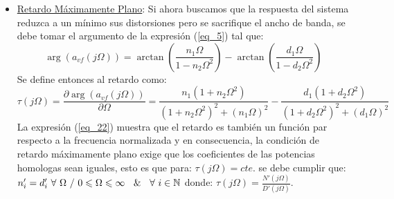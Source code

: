 \documentclass[12pt,a4paper]{article}
\begin{document}
\begin{itemize}
    
     \item \underline{Retardo Máximamente Plano}: Si ahora buscamos que la respuesta del sistema reduzca a un mínimo sus distorsiones pero se sacrifique el ancho de banda, se debe tomar el argumento de la expresión (\ref{eq_5}) tal que:
    \begin{equation}
        \label{eq_21}
        \arg(a_{vf}(j\Omega))= \arctan\left(\frac{n_{1} \Omega}{1 - n_{2} \Omega^{2}}\right) - \arctan\left(\frac{d_{1} \Omega}{1 - d_{2} \Omega^{2}}\right)
    \end{equation}
    Se define entonces al retardo como:
    \begin{equation}
        \label{eq_22}
        \tau(j\Omega) = \frac{\partial \arg(a_{vf}(j\Omega))}{\partial \Omega} = \frac{n_{1}(1 + n_{2}\Omega^{2})}{(1 + n_{2}\Omega^{2})^{2} + (n_{1}\Omega)^{2}} - \frac{d_{1}(1 + d_{2}\Omega^{2})}{(1 + d_{2}\Omega^{2})^{2}+(d_{1}\Omega)^{2}} 
    \end{equation}
    La expresión (\ref{eq_22}) muestra que el retardo es también un función par respecto a la frecuencia normalizada y en consecuencia, la condición de retardo máximamente plano exige que los coeficientes de las potencias homologas sean iguales, esto es que para: $\tau(j\Omega) = cte.$ se debe cumplir que: $n'_{i} = d'_{i} \ \forall \ \Omega \ / \ 0 \leqslant \Omega \leqslant \infty \ \And \ \forall \ i\in \mathbb{N}$ donde: $\tau(j\Omega)=\frac{N'(j\Omega)}{D'(j\Omega)}$.


\end{itemize}
\end{document}
